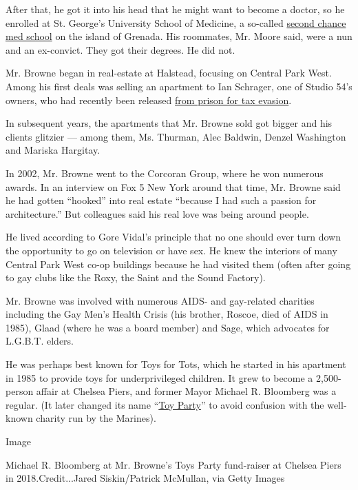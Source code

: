 After that, he got it into his head that he might want to become a
doctor, so he enrolled at St. George's University School of Medicine, a
so-called
\href{https://www.nytimes.com/2014/08/03/education/edlife/second-chance-med-school.html}{second
chance med school} on the island of Grenada. His roommates, Mr. Moore
said, were a nun and an ex-convict. They got their degrees. He did not.

Mr. Browne began in real-estate at Halstead, focusing on Central Park
West. Among his first deals was selling an apartment to Ian Schrager,
one of Studio 54's owners, who had recently been released
\href{https://www.nytimes.com/2017/01/18/nyregion/obama-pardons-ian-schrager.html}{from
prison for tax evasion}.

In subsequent years, the apartments that Mr. Browne sold got bigger and
his clients glitzier --- among them, Ms. Thurman, Alec Baldwin, Denzel
Washington and Mariska Hargitay.

In 2002, Mr. Browne went to the Corcoran Group, where he won numerous
awards. In an interview on Fox 5 New York around that time, Mr. Browne
said he had gotten ``hooked'' into real estate ``because I had such a
passion for architecture.'' But colleagues said his real love was being
around people.

He lived according to Gore Vidal's principle that no one should ever
turn down the opportunity to go on television or have sex. He knew the
interiors of many Central Park West co-op buildings because he had
visited them (often after going to gay clubs like the Roxy, the Saint
and the Sound Factory).

Mr. Browne was involved with numerous AIDS- and gay-related charities
including the Gay Men's Health Crisis (his brother, Roscoe, died of AIDS
in 1985), Glaad (where he was a board member) and Sage, which advocates
for L.G.B.T. elders.

He was perhaps best known for Toys for Tots, which he started in his
apartment in 1985 to provide toys for underprivileged children. It grew
to become a 2,500-person affair at Chelsea Piers, and former Mayor
Michael R. Bloomberg was a regular. (It later changed its name
``\href{https://www.nydailynews.com/entertainment/gossip/mayor-bloomberg-shows-playful-side-annual-toy-party-jokes-closets-marriage-equality-article-1.469987}{Toy
Party}'' to avoid confusion with the well-known charity run by the
Marines).

Image

Michael R. Bloomberg at Mr. Browne's Toys Party fund-raiser at Chelsea
Piers in 2018.Credit...Jared Siskin/Patrick McMullan, via Getty Images

